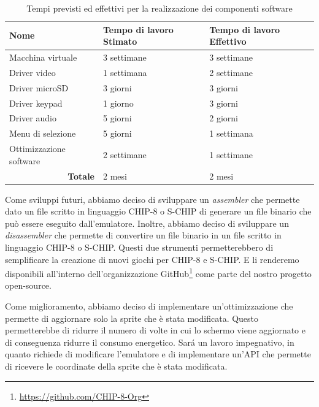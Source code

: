 \documentclass[a4paper]{article}
\begin{document}
\begin{center}
    \begin{table}[ht]
        \centering
        \begin{tabular}{|l|l|l|}
            \hline
            \textbf{Nome}                         & \textbf{Tempo di lavoro Stimato} & \textbf{Tempo di lavoro Effettivo} \\ \hline
            Macchina virtuale                     & 3 settimane                      & 3 settimane                        \\ \hline
            Driver video                          & 1 settimana                      & 2 settimane                        \\ \hline
            Driver microSD                        & 3 giorni                         & 3 giorni                           \\ \hline
            Driver keypad                         & 1 giorno                         & 3 giorni                           \\ \hline
            Driver audio                          & 5 giorni                         & 2 giorni                           \\ \hline
            Menu di selezione                     & 5 giorni                         & 1 settimana                        \\ \hline
            Ottimizzazione software               & 2 settimane                      & 1 settimane                        \\ \hline
            \multicolumn{1}{|r|}{\textbf{Totale}} & 2 mesi                           & 2 mesi                             \\ \hline
        \end{tabular}
        \caption{
            Tempi previsti ed effettivi per la realizzazione dei componenti software
        }
    \end{table}
\end{center}

Come sviluppi futuri, abbiamo deciso di sviluppare un \textit{assembler} che permette dato un file scritto in linguaggio CHIP-8 o S-CHIP di generare un file binario che può essere eseguito dall'emulatore. Inoltre, abbiamo deciso di sviluppare un \textit{disassembler} che permette di convertire un file binario in un file scritto in linguaggio CHIP-8 o S-CHIP. Questi due strumenti permetterebbero di semplificare la creazione di nuovi giochi per CHIP-8 e S-CHIP. E li renderemo disponibili all'interno dell'organizzazione GitHub\footnote{\url{https://github.com/CHIP-8-Org}} come parte del nostro progetto open-source.

Come miglioramento, abbiamo deciso di implementare un'ottimizzazione che permette di aggiornare solo la sprite che è stata modificata. Questo permetterebbe di ridurre il numero di volte in cui lo schermo viene aggiornato e di conseguenza ridurre il consumo energetico. Sar\'a un lavoro impegnativo, in quanto richiede di modificare l'emulatore e di implementare un'API che permette di ricevere le coordinate della sprite che è stata modificata.



\end{document}

